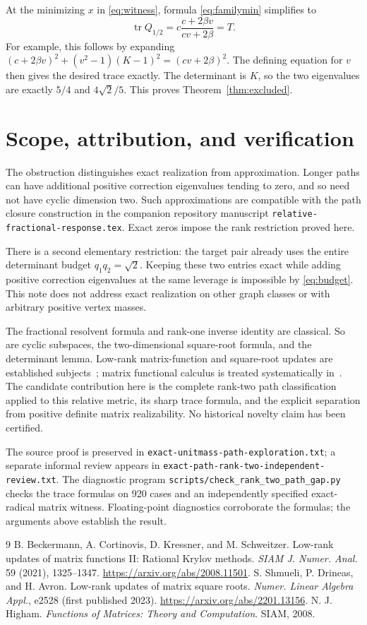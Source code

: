 \documentclass[11pt]{article}
\newcommand{\tr}{\operatorname{tr}}
\begin{document}
At the minimizing $x$ in \eqref{eq:witness}, formula
\eqref{eq:familymin} simplifies to
\[
 \tr Q_{1/2}=c\frac{c+2\beta v}{cv+2\beta}=T.
\]
For example, this follows by expanding
$(c+2\beta v)^2+(v^2-1)(K-1)^2=(cv+2\beta)^2$.
The defining equation for $v$ then gives the desired trace exactly.
The determinant is $K$, so the two eigenvalues are exactly
$5/4$ and $4\sqrt2/5$. This proves Theorem~\ref{thm:excluded}.

\section{Scope, attribution, and verification}

The obstruction distinguishes exact realization from approximation.
Longer paths can have additional positive correction eigenvalues
tending to zero, and so need not have cyclic dimension two. Such
approximations are compatible with the path closure construction in
the companion repository manuscript
\texttt{relative-fractional-response.tex}. Exact zeros impose the
rank restriction proved here.

There is a second elementary restriction: the target pair already
uses the entire determinant budget $q_1q_2=\sqrt2$. Keeping these
two entries exact while adding positive correction eigenvalues at
the same leverage is impossible by \eqref{eq:budget}. This note
does not address exact realization on other graph classes or with
arbitrary positive vertex masses.

The fractional resolvent formula and rank-one inverse identity are
classical. So are cyclic subspaces, the two-dimensional square-root
formula, and the determinant lemma. Low-rank matrix-function and square-root updates
are established subjects~\cite{BCKS,SDA}; matrix functional calculus
is treated systematically in~\cite{Higham}. The candidate contribution
here is the complete rank-two path classification applied to this
relative metric, its sharp trace formula, and the explicit separation
from positive definite matrix realizability. No historical novelty
claim has been certified.

The source proof is preserved in
\texttt{exact-unitmass-path-exploration.txt}; a separate informal
review appears in \texttt{exact-path-rank-two-independent-review.txt}.
The diagnostic program \texttt{scripts/check\_rank\_two\_path\_gap.py}
checks the trace formulas on 920 cases and an independently specified
exact-radical matrix witness. Floating-point diagnostics corroborate
the formulas; the arguments above establish the result.

\begin{thebibliography}{9}
B. Beckermann, A. Cortinovis, D. Kressner, and M. Schweitzer.
Low-rank updates of matrix functions II: Rational Krylov methods.
\emph{SIAM J. Numer. Anal.} 59 (2021), 1325--1347.
\url{https://arxiv.org/abs/2008.11501}.
S. Shmueli, P. Drineas, and H. Avron.
Low-rank updates of matrix square roots.
\emph{Numer. Linear Algebra Appl.}, e2528 (first published 2023).
\url{https://arxiv.org/abs/2201.13156}.
N. J. Higham.
\emph{Functions of Matrices: Theory and Computation}.
SIAM, 2008.
\end{thebibliography}
\end{document}
